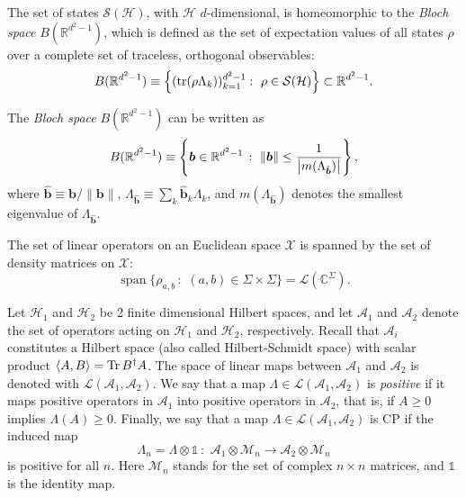 \documentclass[a4paper]{report}
\newcommand{\CC}{\mathbb{C}}
\newcommand{\RR}{\mathbb{R}}
\newcommand{\on}[1]{\operatorname{#1}}
\newcommand{\bs}[1]{\boldsymbol{#1}}
\newcommand{\calH}{{\mathcal{H}}}
\newcommand{\calL}{{\mathcal{L}}}
\newcommand{\calS}{{\mathcal{S}}}
\newcommand{\calX}{{\mathcal{X}}}
\begin{document}
\begin{prop}
	The set of states $\calS(\calH)$, with $\calH$ $d$-dimensional, is homeomorphic to the \emph{Bloch space} $B(\RR^{d^2-1})$, which is defined as the set of expectation values of all states $\rho$ over a complete set of traceless, orthogonal observables:
	\begin{equation}
		B(\RR^{d^2-1})\equiv\left\{
			(\tr(\rho\Lambda_k))_{k=1}^{d^2-1}:\,\,\rho\in\calS(\calH)
		\right\} \subset \RR^{d^2-1}.
	\end{equation}
\end{prop}

\begin{prop}
	The \emph{Bloch space} $B(\RR^{d^2-1})$ can be written as
	\begin{equation}
		B(\RR^{d^2-1}) \equiv \left\{
			\bs b\in\RR^{d^2-1}\,:\,\,\|\bs b\|\le\frac{1}{\abs{m(\Lambda_{\hat{\bs b}})}}
		\right\},
	\end{equation}
	where $\hat{\bs b}\equiv\bs b/\|\bs b\|$, $\Lambda_{\hat{\bs b}}\equiv\sum_k \hat{\bs b}_k \Lambda_k$, and $m(\Lambda_{\hat{\bs b}})$ denotes the smallest eigenvalue of $\Lambda_{\hat{\bs b}}$.
\end{prop}

\begin{prop}[a]
	The set of linear operators on an Euclidean space $\calX$ is spanned by the set of density matrices on $\calX$:
	\begin{equation}
		\on{span}\{\rho_{a,b}\,:\,\,(a,b)\in\Sigma\times\Sigma\}
		= \calL(\CC^\Sigma).
	\end{equation}
\end{prop}

\begin{defn}
	Let $\mathcal H_1$ and $\mathcal H_2$ be 2 finite dimensional Hilbert spaces,
	and let $\mathcal A_1$ and $\mathcal A_2$ denote the set of operators acting on $\mathcal H_1$ and $\mathcal H_2$, respectively.
	Recall that $\mathcal A_i$ constitutes a Hilbert space (also called Hilbert-Schmidt space) with scalar product $\langle A, B\rangle = \Tr B^\dagger A$.
	The space of linear maps between $\mathcal A_1$ and $\mathcal A_2$ is denoted with
	$\mathcal L(\mathcal A_1, \mathcal A_2)$.
	We say that a map $\Lambda \in \mathcal L(\mathcal A_1, \mathcal A_2)$ is \emph{positive}
	if it maps positive operators in $\mathcal A_1$ into positive operators in $\mathcal A_2$,
	that is,
	if $A \ge 0$ implies $\Lambda(A) \ge 0$.
	Finally, we say that a map $\Lambda \in \mathcal L(\mathcal A_1, \mathcal A_2)$ is \ac{CP} if the induced map
	\begin{equation}
		\Lambda_n = \Lambda \otimes \mathds1 \, : \,\,
		\mathcal A_1 \otimes \mathcal M_n \to \mathcal A_2 \otimes \mathcal M_n
	\end{equation}
	is positive for all $n$.
	Here $\mathcal M_n$ stands for the set of complex $n\times n$ matrices,
	and $\mathds 1$ is the identity map.
	\label{def:positive_maps}
\end{defn}
\end{document}

